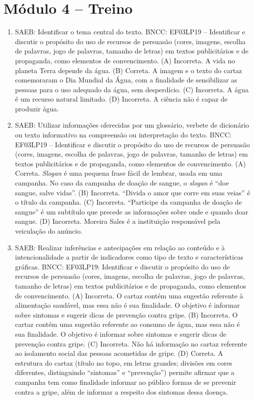 \section*{Módulo 4 – Treino}

\begin{enumerate}
\item
SAEB: Identificar o tema central do texto.
BNCC: EF03LP19 -- Identificar e discutir o propósito do uso de recursos de
persuasão (cores, imagens, escolha de palavras, jogo de palavras,
tamanho de letras) em textos publicitários e de propaganda, como
elementos de convencimento.
(A) Incorreta. A vida no planeta Terra depende da água. 
(B) Correta. A imagem e o texto do cartaz  comemoraram o Dia Mundial da Água, com a finalidade de sensibilizar as pessoas para o uso adequado da água, sem desperdício.   
(C) Incorreta. A água é um recurso natural limitado.  
(D) Incorreta. A ciência não é capaz de produzir água. 

\item
SAEB: Utilizar informações oferecidas por um glossário, verbete de
dicionário ou texto informativo na compreensão ou interpretação do
texto.
BNCC: EF03LP19 -- Identificar e discutir o propósito do uso de recursos de
persuasão (cores, imagens, escolha de palavras, jogo de palavras,
tamanho de letras) em textos publicitários e de propaganda, como
elementos de convencimento.
(A) Correta. \textit{Slogan} é uma pequena frase fácil de lembrar, usada em uma campanha. No caso da campanha de doação de sangue, o \textit{slogan} é ``doe sangue, salve vidas''.
(B) Incorreta. ``Divida o amor que corre em suas veias'' é o título da
campanha.
(C) Incorreta. ``Participe da campanha de doação de sangue'' é um subtítulo
que precede as informações sobre onde e quando doar sangue.
(D) Incorreta. Moreira Sales é a instituição responsável pela veiculação
do anúncio.

\item
SAEB: Realizar inferências e antecipações em relação ao conteúdo
e à intencionalidade a partir de indicadores como tipo de texto e
características gráficas.
BNCC: EF03LP19: Identificar e discutir o propósito do uso de recursos de
persuasão (cores, imagens, escolha de palavras, jogo de palavras,
tamanho de letras) em textos publicitários e de propaganda, como
elementos de convencimento.
(A) Incorreta. O cartaz contém uma sugestão referente à alimentação 
saudável, mas essa não é sua finalidade. O objetivo é informar sobre 
sintomas e sugerir dicas de prevenção contra gripe.  
(B) Incorreta. O cartaz contém uma sugestão referente ao consumo de água,
mas essa não é sua finalidade. O objetivo é informar sobre sintomas e 
sugerir dicas de prevenção contra gripe.
(C) Incorreta. Não há informação no cartaz referente ao isolamento social 
das pessoas acometidas de gripe. 
(D) Correta. A estrutura do cartaz (título no topo, em letras grandes; 
divisões em cores diferentes, distinguindo ``sintomas'' e ``prevenção'') 
permite afirmar que a campanha tem como finalidade informar ao público 
formas de se prevenir contra a gripe, além de informar a respeito dos
sintomas dessa doença.
\end{enumerate}

